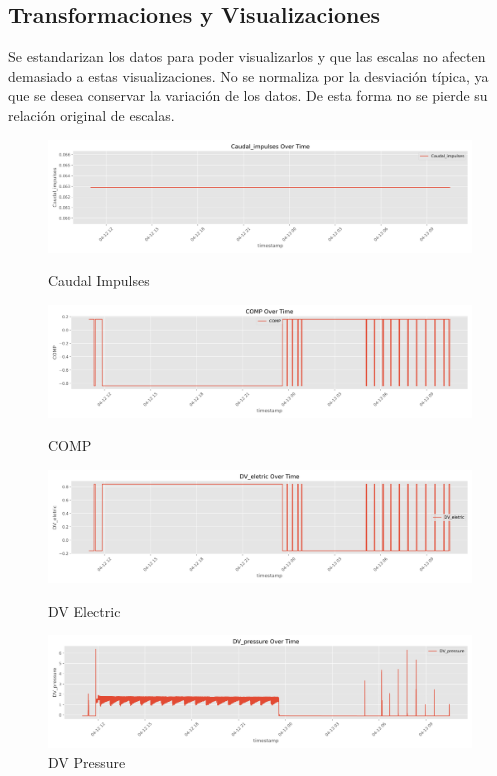 \documentclass[12pt,letterpaper]{article}
\begin{document}
\subsection{Transformaciones y Visualizaciones}
Se estandarizan los datos para poder visualizarlos y que las escalas no afecten demasiado a estas visualizaciones. No se normaliza por la desviación típica, ya que se desea conservar la variación de los datos. De esta forma no se pierde su relación original de escalas.

\begin{figure}[htp]
    \centering
    \begin{minipage}[b]{0.45\textwidth}
        \centering
        \includegraphics[width=\textwidth]{Caudal_impulses.png}
        \caption*{Caudal Impulses}
    \end{minipage}
    \hfill
    \begin{minipage}[b]{0.45\textwidth}
        \centering
        \includegraphics[width=\textwidth]{COMP.png}
        \caption*{COMP}
    \end{minipage}
    \vspace{0.5em} %

    \begin{minipage}[b]{0.45\textwidth}
        \centering
        \includegraphics[width=\textwidth]{DV_eletric.png}
        \caption*{DV Electric}
    \end{minipage}
    \hfill
    \begin{minipage}[b]{0.45\textwidth}
        \centering
        \includegraphics[width=\textwidth]{DV_pressure.png}
        \caption*{DV Pressure}
    \end{minipage}
    \vspace{0.5em}


\end{figure}
\end{document}

